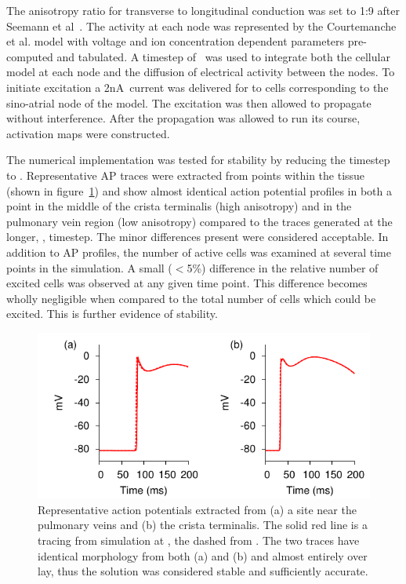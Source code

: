 The anisotropy ratio for transverse to longitudinal conduction was set to 1:9
after Seemann et al~\cite{Seemann2006}.
The activity at each node was represented by the Courtemanche et al. model with
voltage and ion concentration dependent parameters pre-computed and tabulated.
A timestep of \ was used to integrate both the cellular model at each
node and the diffusion of electrical activity between the nodes.
To initiate excitation a \unit{2}{nA}\ current was delivered for  to cells
corresponding to the sino-atrial node of the model.
The excitation was then allowed to propagate without interference.
After the propagation was allowed to run its course, activation maps were
constructed.

The numerical implementation was tested for stability by reducing the timestep to .
Representative AP traces were extracted from points within the
tissue (shown in figure~\ref{fig:atrium:structure:stability}) and show almost
identical action potential profiles in both a point in the middle of the crista
terminalis (high anisotropy) and in the pulmonary vein region (low anisotropy)
compared to the traces generated at the longer, , timestep.
The minor differences present were considered acceptable.
In addition to AP profiles, the number of active cells was examined at several
time points in the simulation.
A small ($<$5\%) difference in the relative number of excited cells was observed
at any given time point.
This difference becomes wholly negligible when compared to the total number of cells which could
be excited.
This is further evidence of stability.
\begin{figure}
\begin{center}
\includegraphics{figures/atrium/validation/stability/stability}
\end{center}
\caption[Extracted AP traces at 0.002ms and 0.02ms]{
\label{fig:atrium:structure:stability}
Representative action potentials extracted from (a) a site near the pulmonary
veins and (b) the crista terminalis.
The solid red line is a tracing from simulation at , the dashed from
.
The two traces have identical morphology from both (a) and (b) and almost
entirely over lay, thus the solution was considered stable and sufficiently
accurate.
}
\end{figure}

